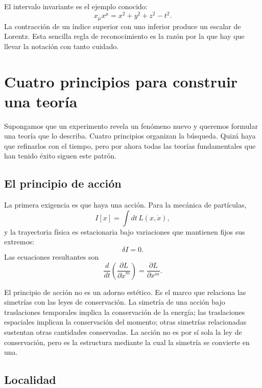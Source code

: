 El intervalo invariante es el ejemplo conocido:
\begin{equation}
x_\mu x^\mu
=
x^2+y^2+z^2-t^2.
\label{eq:sr7-interval}
\end{equation}
La contracción de un índice superior con uno inferior produce un escalar de Lorentz. Esta sencilla regla de reconocimiento es la razón por la que hay que llevar la notación con tanto cuidado.

\section{Cuatro principios para construir una teoría}

Supongamos que un experimento revela un fenómeno nuevo y queremos formular una teoría que lo describa. Cuatro principios organizan la búsqueda. Quizá haya que refinarlos con el tiempo, pero por ahora todas las teorías fundamentales que han tenido éxito siguen este patrón.

\subsection{El principio de acción}

La primera exigencia es que haya una acción. Para la mecánica de partículas,
\begin{equation}
I[x]
=
\int dt\,L(x,\dot x),
\label{eq:sr7-particle-action-general}
\end{equation}
y la trayectoria física es estacionaria bajo variaciones que mantienen fijos sus extremos:
\begin{equation}
\delta I=0.
\end{equation}
Las ecuaciones resultantes son
\begin{equation}
\frac{d}{dt}
\left(
\frac{\partial L}{\partial\dot x^m}
\right)
=
\frac{\partial L}{\partial x^m}.
\label{eq:sr7-EL}
\end{equation}

El principio de acción no es un adorno estético. Es el marco que relaciona las simetrías con las leyes de conservación. La simetría de una acción bajo traslaciones temporales implica la conservación de la energía; las traslaciones espaciales implican la conservación del momento; otras simetrías relacionadas sustentan otras cantidades conservadas. La acción no es por sí sola la ley de conservación, pero es la estructura mediante la cual la simetría se convierte en una.

\subsection{Localidad}

